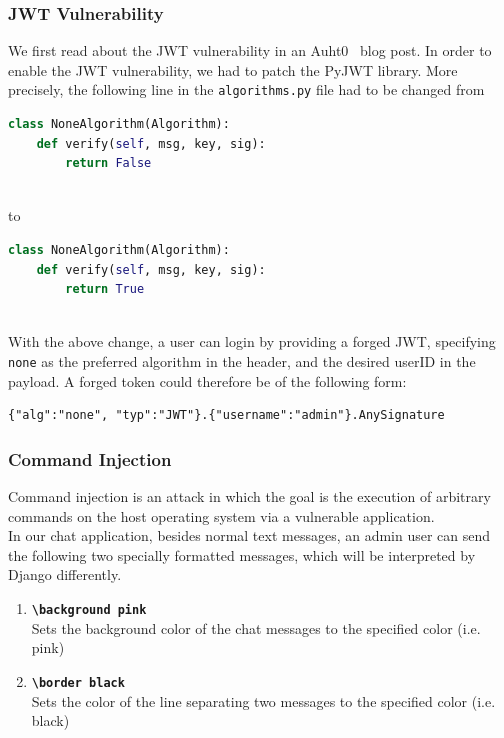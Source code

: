 \documentclass[12pt,a4paper]{article}
\newcommand{\code}[1]{\texttt{#1}}
\begin{document}
\subsubsection{JWT Vulnerability}
We first read about the JWT vulnerability in an Auht0~\cite{auth0-jwt-vuln} blog post.
In order to enable the JWT vulnerability, we had to patch the PyJWT library. More precisely, the following line in the \code{algorithms.py} file had to be changed from

\begin{lstlisting}[language=python]
class NoneAlgorithm(Algorithm):
    def verify(self, msg, key, sig):
        return False
 
 \end{lstlisting}
 to 
 \begin{lstlisting}[language=python]
class NoneAlgorithm(Algorithm):
    def verify(self, msg, key, sig):
        return True
  
  \end{lstlisting}
 
 With the above change, a user can login by providing a forged JWT, specifying \code{none} as the preferred algorithm in the header, and the desired userID in the payload. A forged token could therefore be of the following form:
 \begin{verbatim}
{"alg":"none", "typ":"JWT"}.{"username":"admin"}.AnySignature
  \end{verbatim}

\subsubsection{Command Injection}
Command injection is an attack in which the goal is the execution of arbitrary commands on the host operating system via a vulnerable application.~\cite{owasp-cmd-inj} \\
In our chat application, besides normal text messages, an admin user can send the following two specially formatted messages, which will be interpreted by Django differently.
\begin{enumerate}
\item \textbf{\code{\textbackslash background pink} } \\
Sets the background color of the chat messages to the specified color (i.e. pink)
\item \textbf{\code{\textbackslash border black} } \\
Sets the color of the line separating two messages to the specified color (i.e. black) 
\end{enumerate}
\end{document}
